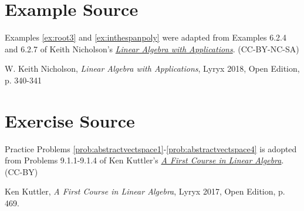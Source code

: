 \documentclass{ximera}
\begin{document}
\section*{Example Source}
Examples \ref{ex:root3} and \ref{ex:inthespanpoly} were adapted from Examples 6.2.4 and 6.2.7 of Keith Nicholson's \href{https://open.umn.edu/opentextbooks/textbooks/linear-algebra-with-applications}{\it Linear Algebra with Applications}. (CC-BY-NC-SA)

W. Keith Nicholson, {\it Linear Algebra with Applications}, Lyryx 2018, Open Edition, p. 340-341 

\section*{Exercise Source}
Practice Problems \ref{prob:abstractvectspace1}-\ref{prob:abstractvectspace4} is adopted from Problems 9.1.1-9.1.4 of Ken Kuttler's \href{https://open.umn.edu/opentextbooks/textbooks/a-first-course-in-linear-algebra-2017}{\it A First Course in Linear Algebra}. (CC-BY)

Ken Kuttler, {\it  A First Course in Linear Algebra}, Lyryx 2017, Open Edition, p. 469.
\end{document}
